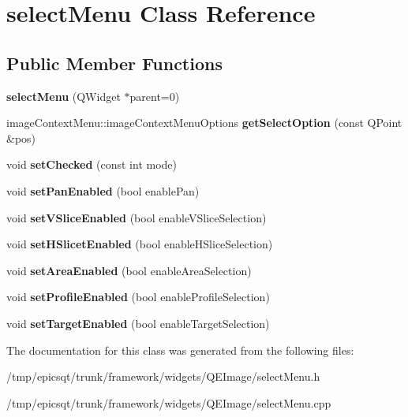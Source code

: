 \hypertarget{classselectMenu}{
\section{selectMenu Class Reference}
\label{classselectMenu}
}
\subsection*{Public Member Functions}
\begin{DoxyCompactItemize}
\item 
\hypertarget{classselectMenu_ac0db91ec86e6ade310acbd7142d18f2a}{
{\bfseries selectMenu} (QWidget $\ast$parent=0)}
\label{classselectMenu_ac0db91ec86e6ade310acbd7142d18f2a}

\item 
\hypertarget{classselectMenu_ad471bef5a9efa5a2eba329ec2303b985}{
imageContextMenu::imageContextMenuOptions {\bfseries getSelectOption} (const QPoint \&pos)}
\label{classselectMenu_ad471bef5a9efa5a2eba329ec2303b985}

\item 
\hypertarget{classselectMenu_aa947246449ad928259f537431dbf471b}{
void {\bfseries setChecked} (const int mode)}
\label{classselectMenu_aa947246449ad928259f537431dbf471b}

\item 
\hypertarget{classselectMenu_a8b40720deb3ba828d6ba62dbc75c2d66}{
void {\bfseries setPanEnabled} (bool enablePan)}
\label{classselectMenu_a8b40720deb3ba828d6ba62dbc75c2d66}

\item 
\hypertarget{classselectMenu_ab1bb5b7a12909c49835c06eb828f15a8}{
void {\bfseries setVSliceEnabled} (bool enableVSliceSelection)}
\label{classselectMenu_ab1bb5b7a12909c49835c06eb828f15a8}

\item 
\hypertarget{classselectMenu_a77dda58ce9759042b8d1de4cbda0cca7}{
void {\bfseries setHSlicetEnabled} (bool enableHSliceSelection)}
\label{classselectMenu_a77dda58ce9759042b8d1de4cbda0cca7}

\item 
\hypertarget{classselectMenu_ae8ef283f1e8a0ba96c77ad1a45315003}{
void {\bfseries setAreaEnabled} (bool enableAreaSelection)}
\label{classselectMenu_ae8ef283f1e8a0ba96c77ad1a45315003}

\item 
\hypertarget{classselectMenu_a4006467f9e742da48c5c36d8d4491607}{
void {\bfseries setProfileEnabled} (bool enableProfileSelection)}
\label{classselectMenu_a4006467f9e742da48c5c36d8d4491607}

\item 
\hypertarget{classselectMenu_ad525d09347fe946d234980be115d93a8}{
void {\bfseries setTargetEnabled} (bool enableTargetSelection)}
\label{classselectMenu_ad525d09347fe946d234980be115d93a8}

\end{DoxyCompactItemize}


The documentation for this class was generated from the following files:\begin{DoxyCompactItemize}
\item 
/tmp/epicsqt/trunk/framework/widgets/QEImage/selectMenu.h\item 
/tmp/epicsqt/trunk/framework/widgets/QEImage/selectMenu.cpp\end{DoxyCompactItemize}
